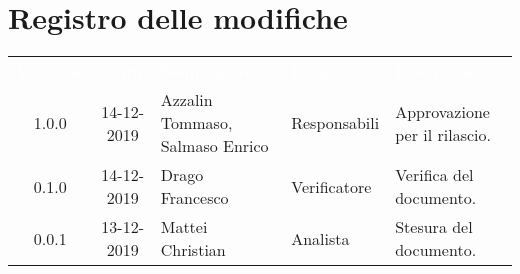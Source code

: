 \section*{Registro delle modifiche}
{
\renewcommand{\arraystretch}{1.5}
\centering
\begin{longtable}{ c c  C{4cm}  C{3cm} C{4cm}}
\textcolor{white}{\textbf{Versione}} & \textcolor{white}{\textbf{Data}} & \textcolor{white}{\textbf{Nominativo}} & \textcolor{white}{\textbf{Ruolo}} & \textcolor{white}{\textbf{Descrizione}}\\	


1.0.0 & 14-12-2019 & Azzalin Tommaso, Salmaso Enrico & Responsabili & Approvazione per il rilascio.  \\
        
0.1.0 & 14-12-2019 & Drago Francesco & Verificatore & Verifica del documento.  \\
		
0.0.1 & 13-12-2019 & Mattei Christian & Analista & Stesura del documento.  \\
		
		
\end{longtable}
}